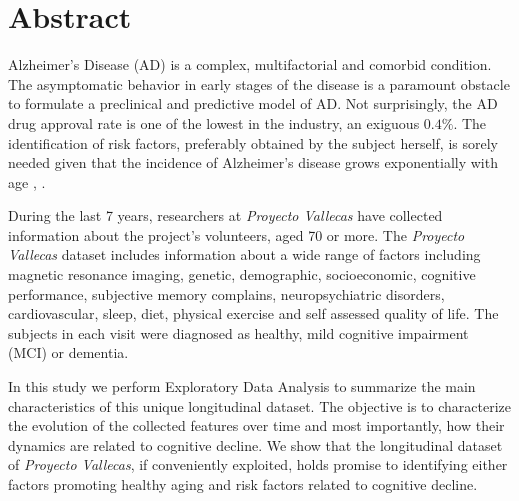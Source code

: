 \documentclass[11pt]{article}
\theoremstyle{definition}
\theoremstyle{remark}
\begin{document}


\section*{Abstract}
Alzheimer's Disease (AD) is a complex, multifactorial and comorbid condition. The asymptomatic behavior in early stages of the disease is a paramount obstacle to formulate a preclinical and predictive model of AD. Not surprisingly, the AD drug approval rate is one of the lowest in the industry, an exiguous $0.4\%$. The identification of risk factors, preferably obtained by the subject herself, is sorely needed given that the incidence of Alzheimer’s disease grows exponentially with age \cite{ferri2005global}, \cite{ganguli2011age}. 

During the last 7 years, researchers at \emph{Proyecto Vallecas} have collected information about the project's volunteers, aged 70 or more. The \emph{Proyecto Vallecas} dataset includes information about a wide range of factors including magnetic resonance imaging, genetic, demographic, socioeconomic, cognitive performance, subjective memory complains, neuropsychiatric disorders, cardiovascular, sleep, diet, physical exercise and self assessed quality of life. The subjects in each visit were diagnosed as healthy, mild cognitive impairment (MCI) or dementia. 

In this study we perform Exploratory Data Analysis to summarize the main characteristics of this unique longitudinal dataset. The objective is to characterize the evolution of the collected features over time and most importantly, how their dynamics are related to cognitive decline. We show that the longitudinal dataset of \emph{Proyecto Vallecas}, if conveniently exploited, holds promise to identifying either factors promoting healthy aging and risk factors related to cognitive decline. 
 
\end{document}
